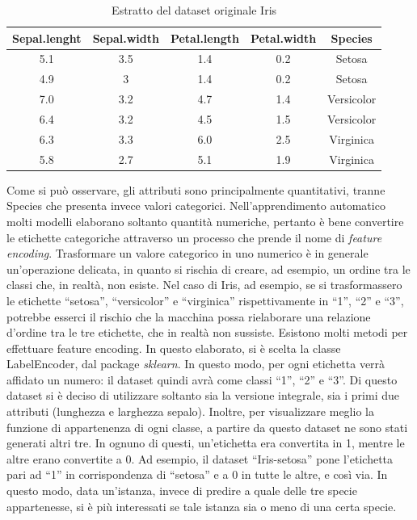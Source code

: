 \documentclass[11pt,  oneside, openany]{book}
\begin{document}
\begin{table} [h!]
    \centering 
    \begin{tabular}{|c|c|c|c|c|}
    \hline
        \textbf{Sepal.lenght} & \textbf{Sepal.width} & \textbf{Petal.length} & \textbf{Petal.width} & \textbf{Species} \\ \hline
        	5.1 	& 3.5 		& 1.4 		& 0.2 		&Setosa\\ 
	4.9 	& 3 		& 1.4 		& 0.2 		&Setosa \\ 
	7.0	& 3.2		& 4.7		&1.4		&Versicolor\\ 
	6.4	& 3.2		& 4.5		&1.5		&Versicolor\\
	6.3	&3.3		&6.0		&2.5		&Virginica\\ 
	5.8	&2.7		&5.1		&1.9		&Virginica\\ \hline	
   \end{tabular}
\caption{Estratto del dataset originale Iris}
\label{table:3}
\end{table}

Come si può osservare, gli attributi sono principalmente quantitativi, tranne Species che presenta invece valori categorici. Nell'apprendimento automatico molti modelli elaborano soltanto quantità numeriche, pertanto è bene convertire le etichette categoriche attraverso un processo che prende il nome di \textit{feature encoding}. Trasformare un valore categorico in uno numerico è in generale un'operazione delicata, in quanto si rischia di creare, ad esempio, un ordine tra le classi che, in realtà, non esiste. Nel caso di Iris, ad esempio, se si trasformassero le etichette  ``setosa'', ``versicolor'' e ``virginica'' rispettivamente in ``1'', ``2'' e ``3'', potrebbe esserci il rischio che la macchina possa rielaborare una relazione d'ordine tra le tre etichette, che in realtà non sussiste. Esistono molti metodi per effettuare feature encoding. In questo elaborato, si è scelta la classe LabelEncoder, dal package \textit{sklearn}. In questo modo, per ogni etichetta verrà affidato un numero: il dataset quindi avrà come classi ``1'', ``2'' e ``3''. Di questo dataset si è deciso di utilizzare soltanto sia la versione integrale, sia i primi due attributi (lunghezza e larghezza sepalo). Inoltre, per visualizzare meglio la funzione di appartenenza di ogni classe, a partire da questo dataset ne sono stati generati altri tre. In ognuno di questi, un'etichetta era convertita in 1, mentre le altre erano convertite a 0. Ad esempio, il dataset ``Iris-setosa'' pone l'etichetta pari ad ``1'' in corrispondenza di ``setosa'' e a 0 in tutte le altre, e così via. 
 In questo modo, data un'istanza, invece di predire a quale delle tre specie appartenesse, si è più interessati se tale istanza sia o meno di una certa specie. 
\end{document}
